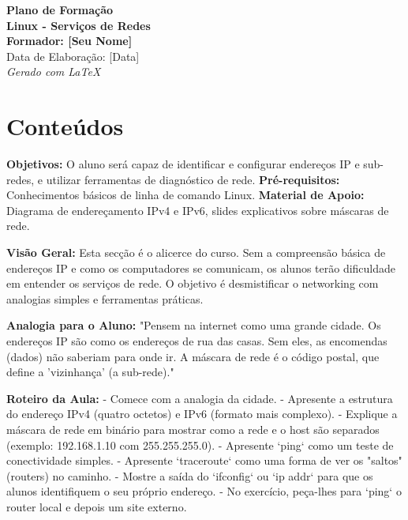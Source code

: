 \documentclass[10pt,a4paper]{article}
\newcommand{\guia}[1]{%
	\begin{tcolorbox}[
		colback=lightgray,
		colframe=darkblue,
		boxrule=1pt,
		arc=4mm,
		title=\textbf{Guia do Formador},
		fonttitle=\bfseries,
		coltitle=darkblue,
		boxsep=5pt,
		left=5mm, right=5mm, top=3mm, bottom=3mm
		]
		#1
	\end{tcolorbox}
}
\begin{document}
	
	\begin{titlepage}
		\centering
		\vspace*{2cm}
		{\Huge\bfseries Plano de Formação}\\[1.5cm]
		{\Huge\bfseries Linux - Serviços de Redes}\\[2cm]
		{\Large\bfseries Formador: [Seu Nome]}\\[1cm]
		{\large Data de Elaboração: [Data]}\\[4cm]
		\vfill
		{\em Gerado com \LaTeX{}}
	\end{titlepage}
	
	\clearpage
	
	\tableofcontents
	\thispagestyle{empty}
	
	\clearpage
	\section*{Conteúdos}
	
	\guia{
		\textbf{Objetivos:} O aluno será capaz de identificar e configurar endereços IP e sub-redes, e utilizar ferramentas de diagnóstico de rede.
		\textbf{Pré-requisitos:} Conhecimentos básicos de linha de comando Linux.
		\textbf{Material de Apoio:} Diagrama de endereçamento IPv4 e IPv6, slides explicativos sobre máscaras de rede.
		
		\textbf{Visão Geral:} Esta secção é o alicerce do curso. Sem a compreensão básica de endereços IP e como os computadores se comunicam, os alunos terão dificuldade em entender os serviços de rede. O objetivo é desmistificar o networking com analogias simples e ferramentas práticas.
		
		\textbf{Analogia para o Aluno:} "Pensem na internet como uma grande cidade. Os endereços IP são como os endereços de rua das casas. Sem eles, as encomendas (dados) não saberiam para onde ir. A máscara de rede é o código postal, que define a 'vizinhança' (a sub-rede)."
		
		\textbf{Roteiro da Aula:}
		- Comece com a analogia da cidade.
		- Apresente a estrutura do endereço IPv4 (quatro octetos) e IPv6 (formato mais complexo).
		- Explique a máscara de rede em binário para mostrar como a rede e o host são separados (exemplo: 192.168.1.10 com 255.255.255.0).
		- Apresente `ping` como um teste de conectividade simples.
		- Apresente `traceroute` como uma forma de ver os "saltos" (routers) no caminho.
		- Mostre a saída do `ifconfig` ou `ip addr` para que os alunos identifiquem o seu próprio endereço.
		- No exercício, peça-lhes para `ping` o router local e depois um site externo.
	}
\end{document}
